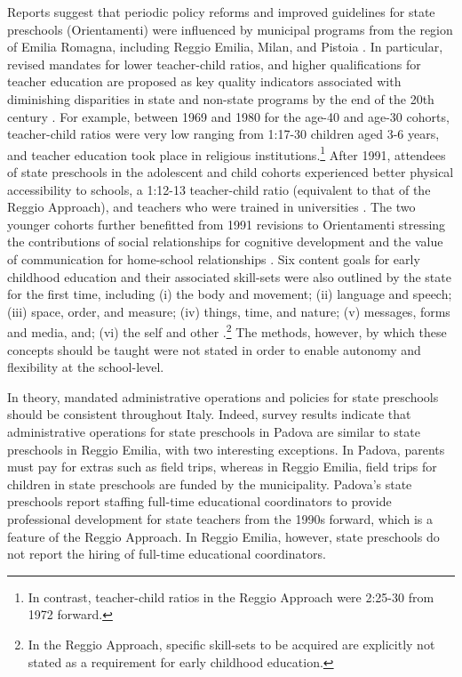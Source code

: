 Reports suggest that periodic policy reforms and improved guidelines for state preschools (Orientamenti) were influenced by municipal programs from the region of Emilia Romagna, including Reggio Emilia, Milan, and Pistoia \citep{OECD_2001_Italy-Country-Note}. In particular, revised mandates for lower teacher-child ratios, and higher qualifications for teacher education are proposed as key quality indicators associated with diminishing disparities in state and non-state programs by the end of the 20th century \citep{Hohnerlein_2015_Development-and-Diffusion}. For example, between 1969 and 1980 for the age-40 and age-30 cohorts, teacher-child ratios were very low ranging from 1:17-30 children aged 3-6 years, and teacher education took place in religious institutions.\footnote{In contrast, teacher-child ratios in the Reggio Approach were 2:25-30 from 1972 forward.} After 1991, attendees of state preschools in the adolescent and child cohorts experienced better physical accessibility to schools, a 1:12-13 teacher-child ratio (equivalent to that of the Reggio Approach), and teachers who were trained in universities \citep{Hohnerlein_2015_Development-and-Diffusion}. The two younger cohorts further benefitted from 1991 revisions to Orientamenti stressing the contributions of social relationships for cognitive development and the value of communication for home-school relationships \citep{OECD_2001_Italy-Country-Note}. Six content goals for early childhood education and their associated skill-sets were also outlined by the state for the first time, including (i) the body and movement; (ii) language and speech; (iii) space, order, and measure; (iv) things, time, and nature; (v) messages, forms and media, and; (vi) the self and other \citep{Orientamenti_1991_Scuola-Materna}.\footnote{In the Reggio Approach, specific skill-sets to be acquired are explicitly not stated as a requirement for early childhood education.} The methods, however, by which these concepts should be taught were not stated in order to enable autonomy and flexibility at the school-level.

In theory, mandated administrative operations and policies for state preschools should be consistent throughout Italy. Indeed, survey results indicate that administrative operations for state preschools in Padova are similar to state preschools in Reggio Emilia, with two interesting exceptions. In Padova, parents must pay for extras such as field trips, whereas in Reggio Emilia, field trips for children in state preschools are funded by the municipality. Padova's state preschools report staffing full-time educational coordinators to provide professional development for state teachers from the 1990s forward, which is a feature of the Reggio Approach. In Reggio Emilia, however, state preschools do not report the hiring of full-time educational coordinators. 

